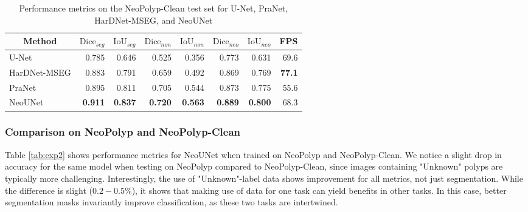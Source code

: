 \documentclass[runningheads]{llncs}
\newcommand{\ModelName}{NeoUNet\xspace}
\newcommand{\DatasetName}{NeoPolyp\xspace}
\newcommand{\CleanDatasetName}{NeoPolyp-Clean\xspace}
\begin{document}
	\begin{table}[]
		\centering
		\caption{Performance metrics on the \CleanDatasetName test set for U-Net, PraNet, HarDNet-MSEG, and \ModelName}
		\label{tab:exp1}
		\begin{tabular}{@{} l r r r r r r r@{}}
			\toprule

			\multicolumn{1}{c}{Method} & \multicolumn{1}{c}{$\text{Dice}_{seg}$} & \multicolumn{1}{c}{$\text{IoU}_{seg}$} & \multicolumn{1}{c}{$\text{Dice}_{non}$} & \multicolumn{1}{c}{$\text{IoU}_{non}$} & \multicolumn{1}{c}{$\text{Dice}_{neo}$} & \multicolumn{1}{c}{$\text{IoU}_{neo}$} & \multicolumn{1}{c}{FPS} \\ \midrule
			U-Net \cite{ronneberger2015u} & 0.785 & 0.646 & 0.525 & 0.356 & 0.773 & 0.631 & 69.6 \\
			HarDNet-MSEG \cite{huang2021hardnet} & 0.883 & 0.791 & 0.659 & 0.492 & 0.869 & 0.769 & \textbf{77.1} \\
			PraNet \cite{fan2020pranet} & 0.895 & 0.811 & 0.705 & 0.544 & 0.873 & 0.775 & 55.6 \\
			\ModelName & \textbf{0.911} & \textbf{0.837} & \textbf{0.720} & \textbf{0.563} & \textbf{0.889} & \textbf{0.800} & 68.3 \\

			\bottomrule
		\end{tabular}
	\end{table}



	\subsubsection{Comparison on \DatasetName and \CleanDatasetName}
	Table \ref{tab:exp2} shows performance metrics for \ModelName when trained on \DatasetName and \CleanDatasetName. We notice a slight drop in accuracy for the same model when testing on \DatasetName compared to \CleanDatasetName, since images containing "Unknown" polyps are typically more challenging. Interestingly, the use of "Unknown"-label data shows improvement for all metrics, not just segmentation. While the difference is slight ($0.2-0.5\%$), it shows that making use of data for one task can yield benefits in other tasks. In this case, better segmentation masks invariantly improve classification, as these two tasks are intertwined.
\end{document}
